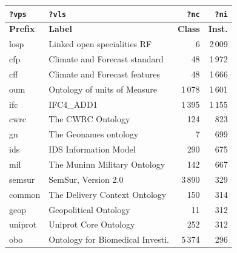 \begin{table}[h]
\footnotesize
\centering
\begin{tabular}{|l|l|r|r|}
\hline
\textbf{\texttt{?vps}} & \textbf{\texttt{?vls}}                  & \textbf{\texttt{?nc}} & \textbf{\texttt{?ni}} \\ \hline
\hline
\textbf{Prefix} & \textbf{Label}                                 & \textbf{Class} & \textbf{Inst.} \\ \hline
losp       & Linked open specialities RF                         & 6              & 2\,009 \\ \hline
cfp        & Climate and Forecast standard                       & 48             & 1\,972 \\ \hline
cff        & Climate and Forecast features                       & 48             & 1\,666 \\ \hline
oum        & Ontology of units of Measure                        & 1\,078         & 1\,601 \\ \hline
ifc        & IFC4\_ADD1                                          & 1\,395         & 1\,155 \\ \hline
cwrc       & The CWRC Ontology                                   & 124            & 823  \\ \hline
gn         & The Geonames ontology                               & 7              & 699  \\ \hline
ids        & IDS Information Model                               & 290            & 675  \\ \hline
mil        & The Muninn Military Ontology                        & 142            & 667  \\ \hline
semsur     & SemSur, Version 2.0                                 & 3\,890         & 329  \\ \hline
common     & The Delivery Context Ontology                       & 150            & 314  \\ \hline
geop       & Geopolitical Ontology                               & 11             & 312  \\ \hline
uniprot    & Uniprot Core Ontology                               & 252            & 312  \\ \hline
obo        & Ontology for Biomedical Investi.                    & 5\,374         & 296  \\ \hline

\end{tabular}
\end{table}
